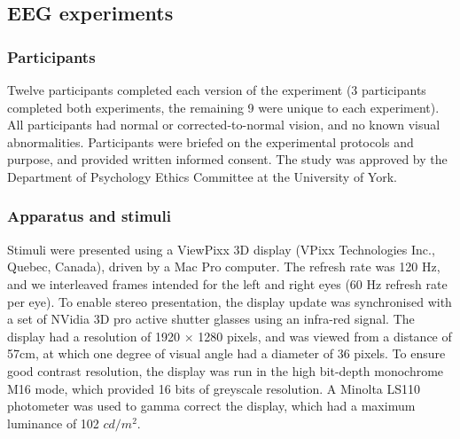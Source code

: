 \documentclass[]{article}
\begin{document}
\hypertarget{eeg-experiments}{%
\subsection{EEG experiments}\label{eeg-experiments}}

\hypertarget{participants}{%
\subsubsection{Participants}\label{participants}}

Twelve participants completed each version of the experiment (3 participants completed both experiments, the remaining 9 were unique to each experiment). All participants had normal or corrected-to-normal vision, and no known visual abnormalities. Participants were briefed on the experimental protocols and purpose, and provided written informed consent. The study was approved by the Department of Psychology Ethics Committee at the University of York.

\hypertarget{apparatus-and-stimuli}{%
\subsubsection{Apparatus and stimuli}\label{apparatus-and-stimuli}}

Stimuli were presented using a ViewPixx 3D display (VPixx Technologies Inc., Quebec, Canada), driven by a Mac Pro computer. The refresh rate was 120 Hz, and we interleaved frames intended for the left and right eyes (60 Hz refresh rate per eye). To enable stereo presentation, the display update was synchronised with a set of NVidia 3D pro active shutter glasses using an infra-red signal. The display had a resolution of 1920 \(\times\) 1280 pixels, and was viewed from a distance of 57cm, at which one degree of visual angle had a diameter of 36 pixels. To ensure good contrast resolution, the display was run in the high bit-depth monochrome M16 mode, which provided 16 bits of greyscale resolution. A Minolta LS110 photometer was used to gamma correct the display, which had a maximum luminance of 102 \(cd/m^2\).
\end{document}
